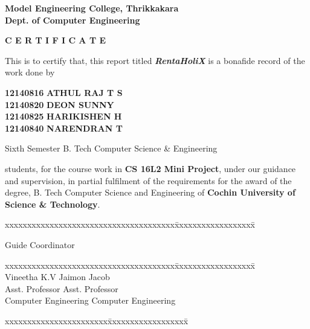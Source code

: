 \documentclass[11pt]{report}
\begin{document}
\begin{titlepage}
\begin{center}
\Large{\textbf{Model Engineering College, Thrikkakara}}\\
\Large{\textbf{Dept. of Computer Engineering}}\\
\end{center}
\begin{figure}[h]
\begin{center}
\end{center}
\end{figure}
\begin{center}
\Large{\textbf{C E R T I F I C A T E}}\\
\vspace{.1in}
\end{center}
This is to certify that, this report titled \textbf{\textit{RentaHoliX}} is a bonafide record of the work done by\\
\begin{center}

\Large{\textbf{12140816}}  \Large{\textbf{ATHUL RAJ T S}}\\ 
\Large{\textbf{12140820}}  \Large{\textbf{DEON SUNNY}}\\ 
\Large{\textbf{12140825}}  \Large{\textbf{HARIKISHEN H}}\\
\Large{\textbf{12140840}}  \Large{\textbf{NARENDRAN T}}\\

\end{center}
\centerline {\textsf{Sixth Semester B. Tech Computer Science \& Engineering}} students, for the course work in \textbf{CS 16L2 Mini Project},  under our guidance and supervision, in partial 
fulfilment of the requirements for the award of the degree, B. Tech Computer Science  and Engineering of \textbf{Cochin University of Science \& Technology}.
\vspace{.1in}
\begin{tabbing}
xxxxxxxxxxxxxxxxxxxxxxxxxxxxxxxxxxxxxx\= xxxxxxxxxxxxxxxxxx\= \kill

Guide			\>				\> Coordinator \\
\end{tabbing}
\begin{tabbing}
xxxxxxxxxxxxxxxxxxxxxxxxxxxxxxxxxxxxxx\= xxxxxxxxxxxxxxxxxx\= \kill
\vspace{.1in}\\		
Vineetha K.V \> \> Jaimon Jacob \\
Asst. Professor	\> \> Asst. Professor\\
Computer  Engineering	\>	\> Computer  Engineering\\
\end{tabbing}
\vspace{.1in}
%
\begin{tabbing}
xxxxxxxxxxxxxxxxxxxxxxx\= xxxxxxxxxxxxxxxxxx\= \kill


\end{tabbing}
\end{titlepage}
\end{document}
